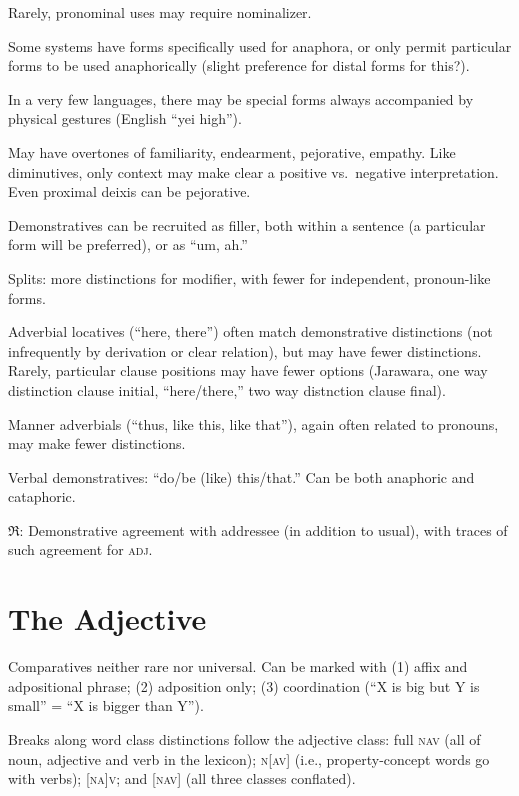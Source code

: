 \documentclass[11pt]{article}
\newcommand{\I}[1]{\textsc{#1}}   %
\newcommand{\rara}[1]{$\mathfrak{R}$: #1}
\begin{document}
Rarely, pronominal uses may require nominalizer.

Some systems have forms specifically used for anaphora, or only permit
particular forms to be used anaphorically (slight preference for
distal forms for this?).

In a very few languages, there may be special forms always accompanied
by physical gestures (English ``yei high'').

May have overtones of familiarity, endearment, pejorative,
empathy.  Like diminutives, only context may make clear a positive
vs.\ negative interpretation.  Even proximal deixis can be
pejorative. 

Demonstratives can be recruited as filler, both within a sentence (a
particular form will be preferred), or as ``um, ah.''

Splits: more distinctions for modifier, with fewer for independent,
pronoun-like forms. 

Adverbial locatives (``here, there'') often match demonstrative
distinctions (not infrequently by derivation or clear relation), but
may have fewer distinctions.  Rarely, particular clause positions may
have fewer options (Jarawara, one way distinction clause initial,
``here/there,'' two way distnction clause final).

Manner adverbials (``thus, like this, like that''), again often
related to pronouns, may make fewer distinctions.

Verbal demonstratives: ``do/be (like) this/that.'' Can be both
anaphoric and cataphoric.

\rara{Demonstrative agreement with addressee (in addition to usual),
  with traces of such agreement for \I{adj}.}



\section{The Adjective}
Comparatives neither rare nor universal.  Can be marked with (1) affix
and adpositional phrase; (2) adposition only; (3) coordination (``X is
big but Y is small'' = ``X is bigger than Y'').

Breaks along word class distinctions follow the adjective class: full
\I{nav} (all of noun, adjective and verb in the lexicon); \I{n[av]}
(i.e., property-concept words go with verbs); \I{[na]v}; and \I{[nav]}
(all three classes conflated).
\end{document}
